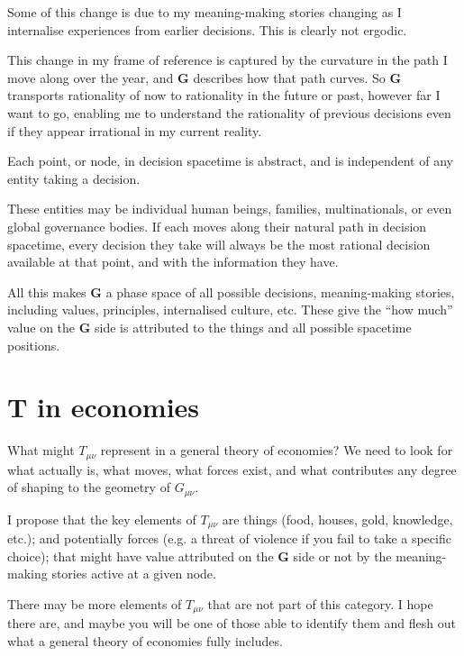 Some of this change is due to my meaning\hyp{}making stories  changing as I internalise experiences from earlier decisions. This is clearly not ergodic.


This change in my frame of reference  is captured by the curvature in the path I move along over the year, and $\mathbf{G}$ describes how that path curves. So $\mathbf{G}$ transports rationality of now to rationality in the future or past, however far I want to go, enabling me to understand the rationality of previous decisions even if they appear irrational in my current reality.


Each point, or node, in decision spacetime is abstract, and is independent of any entity taking a decision. 


These entities may be individual human beings, families, multinationals, or even global governance bodies. If each moves along their natural path in decision spacetime, every decision they take will always be the most rational decision available at that point, and with the information they have.


All this makes $\mathbf{G}$ a phase space of all possible decisions, meaning\hyp{}making stories, including values, principles, internalised culture, etc. These give the “how much” value on the $\mathbf{G}$ side is attributed to the things and all possible spacetime positions.










\section*{T in economies}
What might $T_{\mu\nu}$ represent in a general theory of economies? We need to look for what actually is, what moves, what forces exist, and what contributes any degree of shaping to the geometry of $G_{\mu\nu}$.


I propose that the key elements of $T_{\mu\nu}$ are things (food, houses, gold, knowledge, etc.); and potentially forces (e.g. a threat of violence if you fail to take a specific choice); that might have value attributed on the $\mathbf{G}$ side or not by the meaning\hyp{}making stories active at a given node.


There may be more elements of $T_{\mu\nu}$ that are not part of this category. I hope there are, and maybe you will be one of those able to identify them and flesh out what a general theory of economies fully includes.


